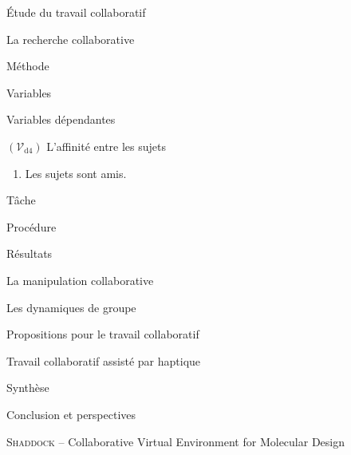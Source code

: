 \documentclass[myfrancais]{mythesis}
\newcommand{\myvar}[2]{$\left(\mathcal{V}_{\mathrm{#1}#2}\right)$\xspace}
\newcommand{\myvard}[1]{\myvar{d}{#1}}
\begin{document}
\begin{mypart}{Étude du travail collaboratif}
\begin{mychapter}{La recherche collaborative}
\begin{mysection}{Méthode}
\begin{mysubsection}{Variables}
\begin{mysubsubsection}{Variables dépendantes}
\begin{myparagraph}{\myvard{4} L'affinité entre les sujets}
\begin{enumerate}
								\item Les sujets sont amis.
							\end{enumerate}
						\end{myparagraph}
					\end{mysubsubsection}
				\end{mysubsection}
				\begin{mysubsection}{Tâche}
				\end{mysubsection}
				\begin{mysubsection}{Procédure}
				\end{mysubsection}
			\end{mysection}
			\begin{mysection}{Résultats}
			\end{mysection}
		\end{mychapter}
		\begin{mychapter}{La manipulation collaborative}
		\end{mychapter}
		\begin{mychapter}{Les dynamiques de groupe}
		\end{mychapter}
	\end{mypart}
	\begin{mypart}{Propositions pour le travail collaboratif}
		\begin{mychapter}{Travail collaboratif assisté par haptique}
		\end{mychapter}
	\end{mypart}
	\begin{mypart}{Synthèse}
		\begin{mychapter}{Conclusion et perspectives}
		\end{mychapter}
	\end{mypart}

	\myglossary
	\appendix
	\begin{mychapter}{\textsc{Shaddock} -- Collaborative Virtual Environment for Molecular Design}
	\end{mychapter}
\end{document}
